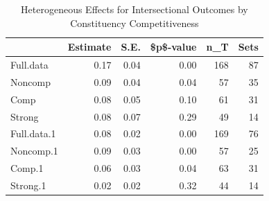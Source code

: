 \begin{table}[ht]
\centering
\caption{Heterogeneous Effects for Intersectional Outcomes 
                        by Constituency Competitiveness} 
\label{tab:results.HETCOMP.intersect}
\begin{tabular}{lrrrrr}
  \hline
 & Estimate & S.E. & \$p\$-value & n\_T & Sets \\ 
  \hline
Full.data & 0.17 & 0.04 & 0.00 & 168 & 87 \\ 
  Noncomp & 0.09 & 0.04 & 0.04 & 57 & 35 \\ 
  Comp & 0.08 & 0.05 & 0.10 & 61 & 31 \\ 
  Strong & 0.08 & 0.07 & 0.29 & 49 & 14 \\ 
  Full.data.1 & 0.08 & 0.02 & 0.00 & 169 & 76 \\ 
  Noncomp.1 & 0.09 & 0.03 & 0.00 & 57 & 25 \\ 
  Comp.1 & 0.06 & 0.03 & 0.04 & 63 & 31 \\ 
  Strong.1 & 0.02 & 0.02 & 0.32 & 44 & 14 \\ 
   \hline
\end{tabular}
\end{table}

